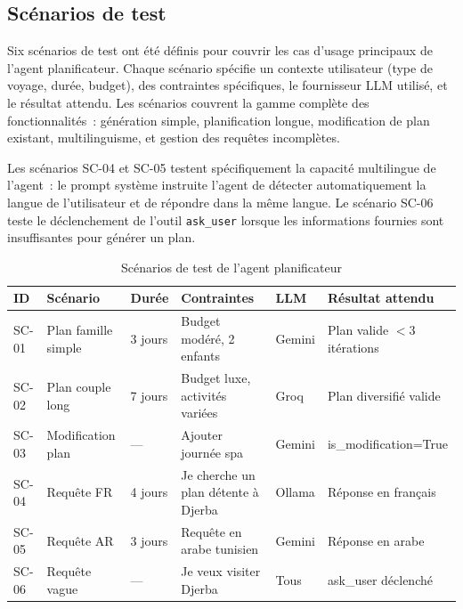 \subsection{Scénarios de test}

Six scénarios de test ont été définis pour couvrir les cas d'usage principaux de l'agent
planificateur. Chaque scénario spécifie un contexte utilisateur (type de voyage, durée,
budget), des contraintes spécifiques, le fournisseur LLM utilisé, et le résultat attendu.
Les scénarios couvrent la gamme complète des fonctionnalités~: génération simple, planification
longue, modification de plan existant, multilinguisme, et gestion des requêtes incomplètes.

Les scénarios SC-04 et SC-05 testent spécifiquement la capacité multilingue de l'agent~:
le prompt système instruite l'agent de détecter automatiquement la langue de l'utilisateur et
de répondre dans la même langue. Le scénario SC-06 teste le déclenchement de l'outil
\texttt{ask\_user} lorsque les informations fournies sont insuffisantes pour générer un plan.

\begin{table}[H]
    \centering
    \caption{Scénarios de test de l'agent planificateur}
    \label{tab:test_scenarios}
    \footnotesize
    \begin{tabular}{p{0.8cm} p{2.8cm} p{1.2cm} p{2.8cm} p{1.5cm} p{3.5cm}}
        \toprule
        \textbf{ID} & \textbf{Scénario} & \textbf{Durée} & \textbf{Contraintes} &
        \textbf{LLM} & \textbf{Résultat attendu} \\
        \midrule
        SC-01 & Plan famille simple & 3 jours & Budget modéré, 2 enfants &
                Gemini & Plan valide $<3$ itérations \\[2pt]
        SC-02 & Plan couple long & 7 jours & Budget luxe, activités variées &
                Groq & Plan diversifié valide \\[2pt]
        SC-03 & Modification plan & — & Ajouter journée spa &
                Gemini & is\_modification=True \\[2pt]
        SC-04 & Requête FR & 4 jours & \og{}Je cherche un plan détente à Djerba\fg{} &
                Ollama & Réponse en français \\[2pt]
        SC-05 & Requête AR & 3 jours & Requête en arabe tunisien &
                Gemini & Réponse en arabe \\[2pt]
        SC-06 & Requête vague & — & \og{}Je veux visiter Djerba\fg{} &
                Tous & ask\_user déclenché \\
        \bottomrule
    \end{tabular}
\end{table}


